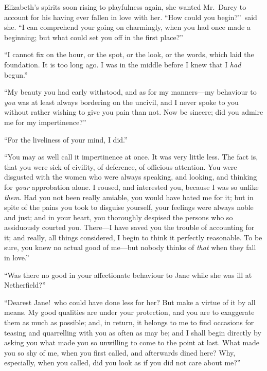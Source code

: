 \documentclass[12pt,english]{book}
\begin{document}

Elizabeth's spirits soon rising to playfulness again, she wanted Mr.\ Darcy
to account for his having ever fallen in love with her. {}``How could
you begin?''\ said she. {}``I can comprehend your going on charmingly,
when you had once made a beginning; but what could set you off in
the first place?''

{}``I cannot fix on the hour, or the spot, or the look, or the words,
which laid the foundation. It is too long ago. I was in the middle
before I knew that I \textit{had} begun.''

{}``My beauty you had early withstood, and as for my manners\mbox{---}my
behaviour to \textit{you} was at least always bordering on the uncivil,
and I never spoke to you without rather wishing to give you pain than
not. Now be sincere; did you admire me for my impertinence?''

{}``For the liveliness of your mind, I did.''

{}``You may as well call it impertinence at once. It was very little
less. The fact is, that you were sick of civility, of deference, of
officious attention. You were disgusted with the women who were always
speaking, and looking, and thinking for \textit{your} approbation
alone. I roused, and interested you, because I was so unlike \textit{them}.
Had you not been really amiable, you would have hated me for it; but
in spite of the pains you took to disguise yourself, your feelings
were always noble and just; and in your heart, you thoroughly despised
the persons who so assiduously courted you. There\mbox{---}I have
saved you the trouble of accounting for it; and really, all things
considered, I begin to think it perfectly reasonable. To be sure,
you knew no actual good of me\mbox{---}but nobody thinks of \textit{that}
when they fall in love.''

{}``Was there no good in your affectionate behaviour to Jane while
she was ill at Netherfield?''

{}``Dearest Jane!\ who could have done less for her? But make a
virtue of it by all means. My good qualities are under your protection,
and you are to exaggerate them as much as possible; and, in return,
it belongs to me to find occasions for teasing and quarrelling with
you as often as may be; and I shall begin directly by asking you what
made you so unwilling to come to the point at last. What made you
so shy of me, when you first called, and afterwards dined here? Why,
especially, when you called, did you look as if you did not care about
me?''
\end{document}
